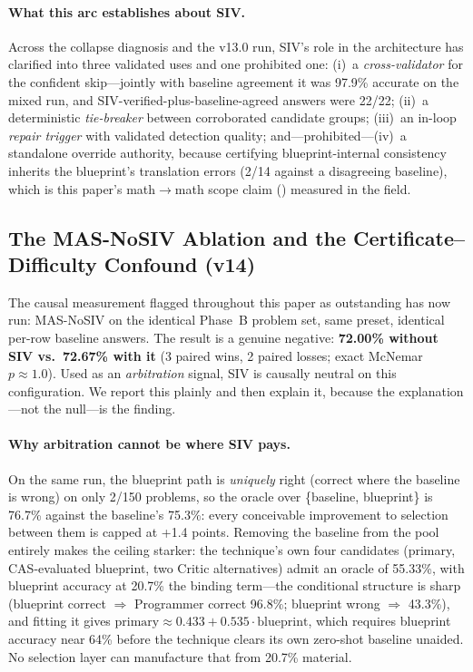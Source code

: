 \documentclass[11pt,a4paper]{article}
\begin{document}
\paragraph{What this arc establishes about SIV.}
Across the collapse diagnosis and the v13.0 run, SIV's role in the architecture has clarified into three validated uses and one prohibited one: (i)~a \emph{cross-validator} for the confident skip---jointly with baseline agreement it was 97.9\% accurate on the mixed run, and SIV-verified-plus-baseline-agreed answers were 22/22; (ii)~a deterministic \emph{tie-breaker} between corroborated candidate groups; (iii)~an in-loop \emph{repair trigger} with validated detection quality; and---prohibited---(iv)~a standalone override authority, because certifying blueprint-internal consistency inherits the blueprint's translation errors (2/14 against a disagreeing baseline), which is this paper's math$\to$math scope claim () measured in the field.

\subsection{The MAS-NoSIV Ablation and the Certificate--Difficulty Confound (v14)}
\label{sec:v14_routing}
The causal measurement flagged throughout this paper as outstanding has now run: MAS-NoSIV on the identical Phase~B problem set, same preset, identical per-row baseline answers.
The result is a genuine negative: \textbf{72.00\% without SIV vs.\ 72.67\% with it} (3 paired wins, 2 paired losses; exact McNemar $p \approx 1.0$).
Used as an \emph{arbitration} signal, SIV is causally neutral on this configuration.
We report this plainly and then explain it, because the explanation---not the null---is the finding.

\paragraph{Why arbitration cannot be where SIV pays.}
On the same run, the blueprint path is \emph{uniquely} right (correct where the baseline is wrong) on only 2/150 problems, so the oracle over \{baseline, blueprint\} is 76.7\% against the baseline's 75.3\%: every conceivable improvement to selection between them is capped at +1.4 points.
Removing the baseline from the pool entirely makes the ceiling starker: the technique's own four candidates (primary, CAS-evaluated blueprint, two Critic alternatives) admit an oracle of 55.33\%, with blueprint accuracy at 20.7\% the binding term---the conditional structure is sharp (blueprint correct $\Rightarrow$ Programmer correct 96.8\%; blueprint wrong $\Rightarrow$ 43.3\%), and fitting it gives $\text{primary} \approx 0.433 + 0.535 \cdot \text{blueprint}$, which requires blueprint accuracy near 64\% before the technique clears its own zero-shot baseline unaided.
No selection layer can manufacture that from 20.7\% material.
\end{document}
